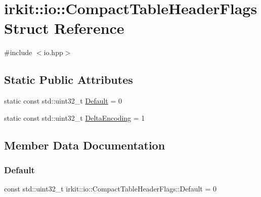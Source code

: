 \hypertarget{structirkit_1_1io_1_1CompactTableHeaderFlags}{}\section{irkit\+:\+:io\+:\+:Compact\+Table\+Header\+Flags Struct Reference}
\label{structirkit_1_1io_1_1CompactTableHeaderFlags}


{\ttfamily \#include $<$io.\+hpp$>$}

\subsection*{Static Public Attributes}
\begin{DoxyCompactItemize}
\item 
static const std\+::uint32\+\_\+t \mbox{\hyperlink{structirkit_1_1io_1_1CompactTableHeaderFlags_a30800f23eaeacbde50aeaef0f4786822}{Default}} = 0
\item 
static const std\+::uint32\+\_\+t \mbox{\hyperlink{structirkit_1_1io_1_1CompactTableHeaderFlags_aa21b5b10940322caca2fa4b322dc23a7}{Delta\+Encoding}} = 1
\end{DoxyCompactItemize}


\subsection{Member Data Documentation}
\mbox{\label{structirkit_1_1io_1_1CompactTableHeaderFlags_a30800f23eaeacbde50aeaef0f4786822}} 
\subsubsection{\texorpdfstring{Default}{Default}}
{\footnotesize\ttfamily const std\+::uint32\+\_\+t irkit\+::io\+::\+Compact\+Table\+Header\+Flags\+::\+Default = 0\hspace{0.3cm}{\ttfamily [static]}}

\mbox{\label{structirkit_1_1io_1_1CompactTableHeaderFlags_aa21b5b10940322caca2fa4b322dc23a7}} 
